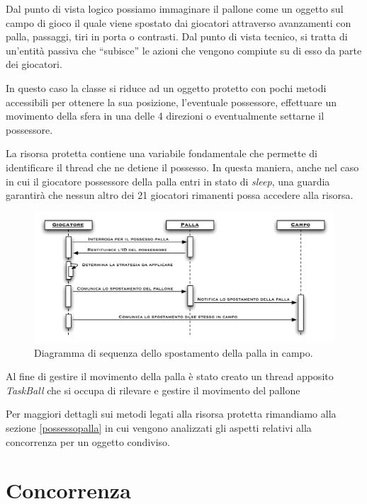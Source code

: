\documentclass[aps,letterpaper,10pt]{article}
\begin{document}
Dal punto di vista logico possiamo immaginare il pallone come un oggetto sul campo di gioco il quale viene spostato dai giocatori attraverso avanzamenti con palla, passaggi, tiri in porta o contrasti. Dal punto di vista tecnico, si tratta di un'entit\`a passiva che ``subisce'' le azioni che vengono compiute su di esso da parte dei giocatori. \vspace{3mm}

In questo caso la classe si riduce ad un oggetto protetto con pochi metodi accessibili per ottenere la sua posizione, l'eventuale possessore, effettuare un movimento della sfera in una delle 4 direzioni o eventualmente settarne il possessore. \vspace{3mm}

La risorsa protetta contiene una variabile fondamentale che permette di identificare il thread che ne detiene il possesso. In questa maniera, anche nel caso in cui il giocatore possessore della palla entri in stato di \emph{sleep}, una guardia garantir\`a che nessun altro dei 21 giocatori rimanenti possa accedere alla risorsa. \vspace{3mm}

\begin{figure}[H]
	\begin{center}
		\includegraphics[width=440px]{images/ball-movement.pdf}
	\end{center}
\caption{Diagramma di sequenza dello spostamento della palla in campo.}
\end{figure}

Al fine di gestire il movimento della palla \`e stato creato un thread apposito \emph{TaskBall} che si occupa di rilevare e gestire il movimento del pallone

Per maggiori dettagli sui metodi legati alla risorsa protetta rimandiamo alla sezione \ref{possessopalla} in cui vengono analizzati gli aspetti relativi alla concorrenza per un oggetto condiviso.

\newpage

\section{Concorrenza}
\label{concorrenza}
\end{document}
